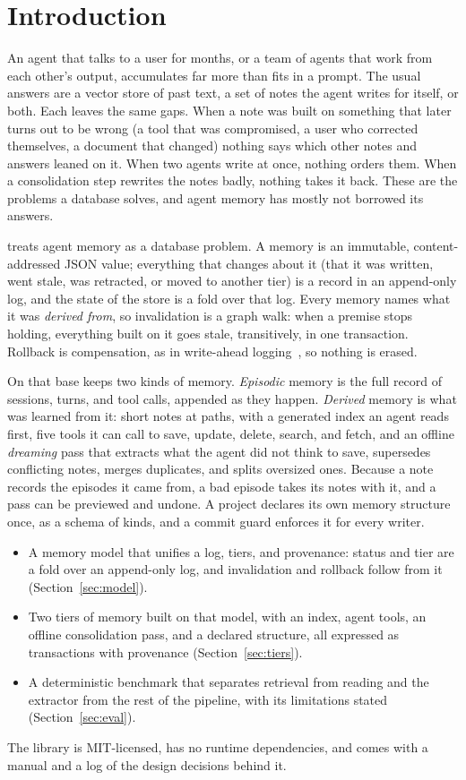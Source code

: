 \section{Introduction}
\label{sec:intro}

An agent that talks to a user for months, or a team of agents that work from
each other's output, accumulates far more than fits in a prompt. The usual
answers are a vector store of past text, a set of notes the agent writes for
itself, or both. Each leaves the same gaps. When a note was built on something
that later turns out to be wrong (a tool that was compromised, a user who
corrected themselves, a document that changed) nothing says which other notes
and answers leaned on it. When two agents write at once, nothing orders them.
When a consolidation step rewrites the notes badly, nothing takes it back. These
are the problems a database solves, and agent memory has mostly not borrowed its
answers.

\sys treats agent memory as a database problem. A memory is an immutable,
content-addressed JSON value; everything that changes about it (that it was
written, went stale, was retracted, or moved to another tier) is a record in an
append-only log, and the state of the store is a fold over that log. Every
memory names what it was \emph{derived from}, so invalidation is a graph walk:
when a premise stops holding, everything built on it goes stale, transitively,
in one transaction. Rollback is compensation, as in write-ahead logging~\cite{aries},
so nothing is erased.

On that base \sys keeps two kinds of memory. \emph{Episodic} memory is the full
record of sessions, turns, and tool calls, appended as they happen. \emph{Derived}
memory is what was learned from it: short notes at paths, with a generated index
an agent reads first, five tools it can call to save, update, delete, search, and
fetch, and an offline \emph{dreaming} pass that extracts what the agent did not
think to save, supersedes conflicting notes, merges duplicates, and splits
oversized ones. Because a note records the episodes it came from, a bad episode
takes its notes with it, and a pass can be previewed and undone. A project
declares its own memory structure once, as a schema of kinds, and a commit guard
enforces it for every writer.

\begin{itemize}
  \item A memory model that unifies a log, tiers, and provenance: status and tier are a fold over an append-only log, and invalidation and rollback follow from it (Section~\ref{sec:model}).
  \item Two tiers of memory built on that model, with an index, agent tools, an offline consolidation pass, and a declared structure, all expressed as transactions with provenance (Section~\ref{sec:tiers}).
  \item A deterministic benchmark that separates retrieval from reading and the extractor from the rest of the pipeline, with its limitations stated (Section~\ref{sec:eval}).
\end{itemize}

\noindent The library is MIT-licensed, has no runtime dependencies, and comes
with a manual and a log of the design decisions behind it.
